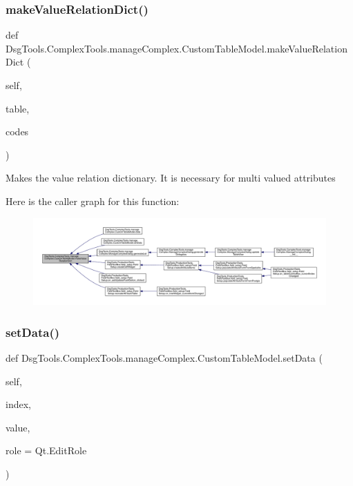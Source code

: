 \subsubsection{\texorpdfstring{make\+Value\+Relation\+Dict()}{makeValueRelationDict()}}
{\footnotesize\ttfamily def Dsg\+Tools.\+Complex\+Tools.\+manage\+Complex.\+Custom\+Table\+Model.\+make\+Value\+Relation\+Dict (\begin{DoxyParamCaption}\item[{}]{self,  }\item[{}]{table,  }\item[{}]{codes }\end{DoxyParamCaption})}

\begin{DoxyVerb}Makes the value relation dictionary. It is necessary for multi valued attributes
\end{DoxyVerb}
 Here is the caller graph for this function\+:
\nopagebreak
\begin{figure}[H]
\begin{center}
\leavevmode
\includegraphics[width=350pt]{class_dsg_tools_1_1_complex_tools_1_1manage_complex_1_1_custom_table_model_a243d268c99b99a6d0b36b206cdd36879_icgraph}
\end{center}
\end{figure}
\mbox{\label{class_dsg_tools_1_1_complex_tools_1_1manage_complex_1_1_custom_table_model_a38742e74ac764ee395cac99b80ddd113}} 
\subsubsection{\texorpdfstring{set\+Data()}{setData()}}
{\footnotesize\ttfamily def Dsg\+Tools.\+Complex\+Tools.\+manage\+Complex.\+Custom\+Table\+Model.\+set\+Data (\begin{DoxyParamCaption}\item[{}]{self,  }\item[{}]{index,  }\item[{}]{value,  }\item[{}]{role = {\ttfamily Qt.EditRole} }\end{DoxyParamCaption})}

